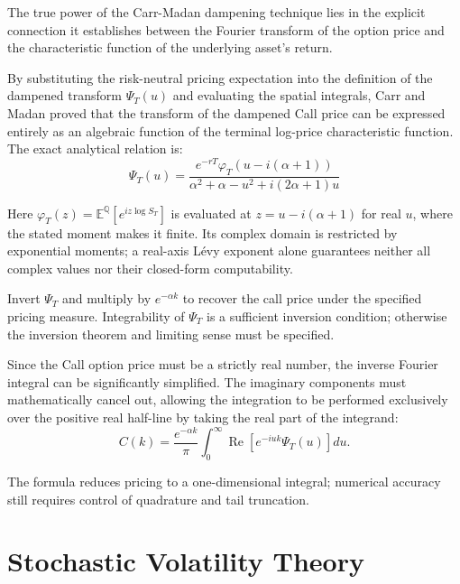 The true power of the Carr-Madan dampening technique lies in the explicit connection it establishes between the Fourier transform of the option price and the characteristic function of the underlying asset's return. 

By substituting the risk-neutral pricing expectation into the definition of the dampened transform $\Psi_T(u)$ and evaluating the spatial integrals, Carr and Madan proved that the transform of the dampened Call price can be expressed entirely as an algebraic function of the terminal log-price characteristic function. The exact analytical relation is:
\begin{equation}
    \Psi_T(u) = \frac{e^{-rT} \varphi_T(u - i(\alpha + 1))}{\alpha^2 + \alpha - u^2 + i(2\alpha + 1)u}
\end{equation}

Here $\varphi_T(z)=\mathbb E^{\mathbb Q}[e^{iz\log S_T}]$ is evaluated
at $z=u-i(\alpha+1)$ for real $u$, where the stated moment makes it
finite. Its complex domain is restricted by exponential moments;
a real-axis L\'evy exponent alone guarantees neither all complex
values nor their closed-form computability.

Invert $\Psi_T$ and multiply by $e^{-\alpha k}$ to recover the call
price under the specified pricing measure. Integrability of $\Psi_T$
is a sufficient inversion condition; otherwise the inversion theorem
and limiting sense must be specified.

Since the Call option price must be a strictly real number, the inverse Fourier integral can be significantly simplified. The imaginary components must mathematically cancel out, allowing the integration to be performed exclusively over the positive real half-line by taking the real part of the integrand:
\begin{equation}\label{eq:carr_madan_pricing}
    C(k) = \frac{e^{-\alpha k}}{\pi} \int_{0}^{\infty} \operatorname{Re}\!\left[ e^{-iuk}\Psi_T(u) \right]du.
\end{equation}

The formula reduces pricing to a one-dimensional integral; numerical
accuracy still requires control of quadrature and tail truncation.


\section{Stochastic Volatility Theory}\label{sec:sv-theory}

